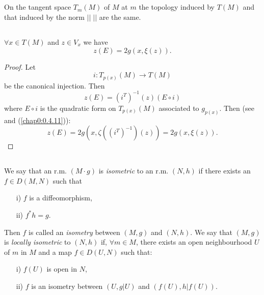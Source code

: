 \subsection{}\label{chap3:3.1.7}
On the tangent space $T_{m}(M)$ of $M$ at $m$ the topology induced by
$T(M)$ and that induced by the norm $||\;||$ are the same. 

\setcounter{subsection}{7}

\subsection{}\label{chap3:3.1.8} %

\begin{lemma*}
$\forall x\in T(M)$ and $z\in V_{x}$ we have
$$
z(E)=2g(x,\xi(z)).
$$
\end{lemma*}

\begin{proof}
Let
$$
i:T_{p(x)}(M)\to T(M)
$$
be the canonical injection. Then
$$
z(E)=(i^{T})^{-1}(z)(E\circ i)
$$
where $E\circ i$ is the quadratic form on $T_{p(x)}(M)$ associated to
$g_{p(x)}$. Then (see \cite{36} and (\ref{chap0:0.4.11})):
$$
z(E)=2g(x,\zeta((i^{T})^{-1})(z))=2g(x,\xi(z)).
$$
\end{proof}

\subsection{}\label{chap3:3.1.9}

\begin{defi*}
We \pageoriginale say that an r.m. $(M\cdot g)$ is {\em isometric} to
an r.m. $(N,h)$ if there exists an $f\in D(M,N)$ such that
\begin{itemize}
\item[i)] $f$ is a diffeomorphism,

\item[ii)] $f^{\ast}h=g$.
\end{itemize}
Then $f$ is called an {\em isometry} between $(M,g)$ and $(N,h)$. We
say that $(M,g)$ is {\em locally isometric} to $(N,h)$ if, $\forall
m\in M$, there exists an open neighbourhood $U$ of $m$ in $M$ and a
map $f\in D(U,N)$ such that:
\begin{itemize}
\item[i)] $f(U)$ is open in $N$,

\item[ii)] $f$ is an isometry between $(U,g|U)$ and $(f(U),h|f(U))$.
\end{itemize}
\end{defi*}

